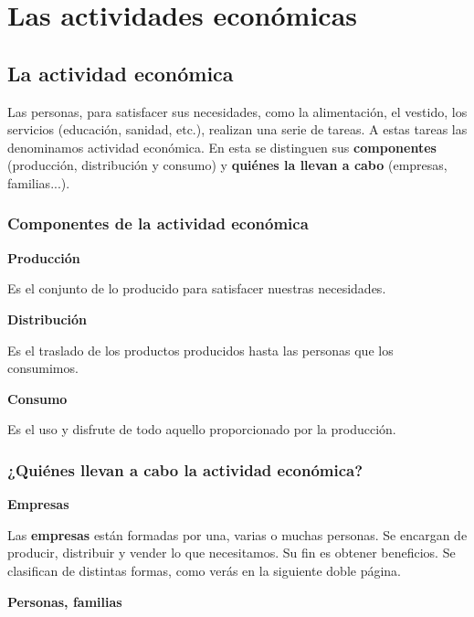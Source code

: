 \section{Las actividades económicas}

\subsection{La actividad económica}

Las personas, para satisfacer sus necesidades, como la alimentación, el vestido, los servicios (educación, sanidad, etc.), realizan una serie de tareas. A estas tareas las denominamos actividad económica. En esta se distinguen sus \textbf{componentes} (producción, distribución y consumo) y \textbf{quiénes la llevan a cabo} (empresas, familias...).

\subsubsection{Componentes de la actividad económica}

\textbf{Producción}

\vspace{3mm}
Es el conjunto de lo producido para satisfacer nuestras necesidades.

\vspace{3mm}
\textbf{Distribución}

\vspace{3mm}
Es el traslado de los productos producidos hasta las personas que los consumimos.

\vspace{3mm}
\textbf{Consumo}

\vspace{3mm}
Es el uso y disfrute de todo aquello proporcionado por la producción.

\subsubsection{¿Quiénes llevan a cabo la actividad económica?}

\textbf{Empresas}

\vspace{3mm}
Las \textbf{empresas} están formadas por una, varias o muchas personas. Se encargan de producir, distribuir y vender lo que necesitamos. Su fin es obtener beneficios. Se clasifican de distintas formas, como verás en la siguiente doble página.

\vspace{3mm}
\textbf{Personas, familias}

